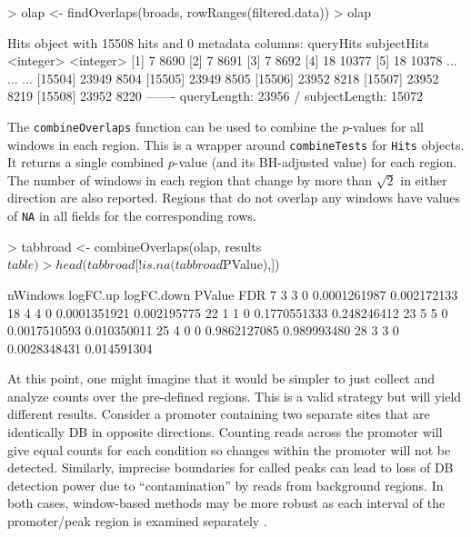 \documentclass[12pt]{report}
\renewenvironment{Schunk}{\vspace{0pt}}{\vspace{0pt}}
\newcommand{\code}[1]{{\small\texttt{#1}}}
\begin{document}
\begin{Schunk}
\begin{Sinput}
> olap <- findOverlaps(broads, rowRanges(filtered.data))
> olap
\end{Sinput}
\begin{Soutput}
Hits object with 15508 hits and 0 metadata columns:
          queryHits subjectHits
          <integer>   <integer>
      [1]         7        8690
      [2]         7        8691
      [3]         7        8692
      [4]        18       10377
      [5]        18       10378
      ...       ...         ...
  [15504]     23949        8504
  [15505]     23949        8505
  [15506]     23952        8218
  [15507]     23952        8219
  [15508]     23952        8220
  -------
  queryLength: 23956 / subjectLength: 15072
\end{Soutput}
\end{Schunk}

The \code{combineOverlaps} function can be used to combine the $p$-values for all windows in each region. 
This is a wrapper around \code{combineTests} for \code{Hits} objects.
It returns a single combined $p$-value (and its BH-adjusted value) for each region. 
The number of windows in each region that change by more than $\sqrt{2}$ in either direction are also reported.
Regions that do not overlap any windows have values of \code{NA} in all fields for the corresponding rows.

\begin{Schunk}
\begin{Sinput}
> tabbroad <- combineOverlaps(olap, results$table)
> head(tabbroad[!is.na(tabbroad$PValue),])
\end{Sinput}
\begin{Soutput}
   nWindows logFC.up logFC.down       PValue         FDR
7         3        3          0 0.0001261987 0.002172133
18        4        4          0 0.0001351921 0.002195775
22        1        1          0 0.1770551333 0.248246412
23        5        5          0 0.0017510593 0.010350011
25        4        0          0 0.9862127085 0.989993480
28        3        3          0 0.0028348431 0.014591304
\end{Soutput}
\end{Schunk}

At this point, one might imagine that it would be simpler to just collect and analyze counts over the pre-defined regions. 
This is a valid strategy but will yield different results. 
Consider a promoter containing two separate sites that are identically DB in opposite directions. 
Counting reads across the promoter will give equal counts for each condition so changes within the promoter will not be detected. 
Similarly, imprecise boundaries for called peaks can lead to loss of DB detection power due to ``contamination'' by reads from background regions. 
In both cases, window-based methods may be more robust as each interval of the promoter/peak region is examined separately \citep{lun2014}.
\end{document}
